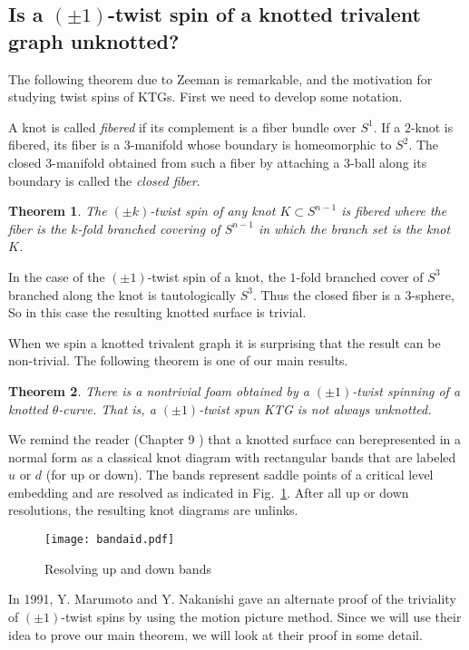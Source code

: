 \documentclass{amsart}
\newtheorem{theorem}{Theorem}[section]
\theoremstyle{definition}
\theoremstyle{remark}
\numberwithin{equation}{section}
\begin{document}
\subsection{Is a $(\pm1)$-twist spin of a knotted trivalent graph unknotted?}
The following theorem due to Zeeman is remarkable, and the motivation for studying twist spins of KTGs. First we need to develop some notation. 

A knot is called \emph{fibered} if its complement is a fiber bundle over $S^{1}$. If a $2$-knot is fibered, its fiber is a $3$-manifold whose boundary is homeomorphic to $S^{2}$. The closed $3$-manifold obtained from such a fiber by attaching a $3$-ball along its boundary is called the \emph{closed fiber}.

\begin{theorem}\cite{Zee65} \label{Zman}
The $(\pm k)$-twist spin of any knot $K \subset S^{n-1}$ is fibered   where the fiber is the $k$-fold branched covering of $S^{n-1}$ in which the branch set is the knot $K$.
\end{theorem}


In the case of the $(\pm 1)$-twist spin of a knot, the $1$-fold branched cover of $S^{3}$ branched along the knot is tautologically $S^{3}$.  Thus the closed fiber is a $3$-sphere, So in this case the resulting knotted surface is trivial. 

When we spin a knotted trivalent graph it is surprising that the result can be non-trivial. The following theorem is one of our main results.

\begin{theorem}\label{main}
There is a nontrivial foam obtained by a $(\pm1)$-twist spinning of a knotted $\theta$-curve. That is, a $(\pm1)$-twist spun KTG is not always unknotted.
\end{theorem}

We remind the reader (Chapter 9 \cite{Kam02}) that a knotted surface can berepresented in a normal form as a classical knot diagram with rectangular bands that are labeled $u$ or $d$ (for up or down). The bands represent saddle points of a critical level embedding and are resolved as indicated in Fig.~\ref{bandaid}. After all up or down resolutions, the resulting knot diagrams are unlinks. 

\begin{figure}[h]
\texttt{[image: bandaid.pdf]}
\caption{Resolving up and down bands}
\label{bandaid}
\end{figure}


In 1991, Y. Marumoto and Y. Nakanishi \cite{MarNak91} gave an alternate proof of the triviality of $(\pm 1)$-twist spins by using the motion picture method. Since we will use their idea to prove our main theorem, we will look at their proof in some detail.
\end{document}

